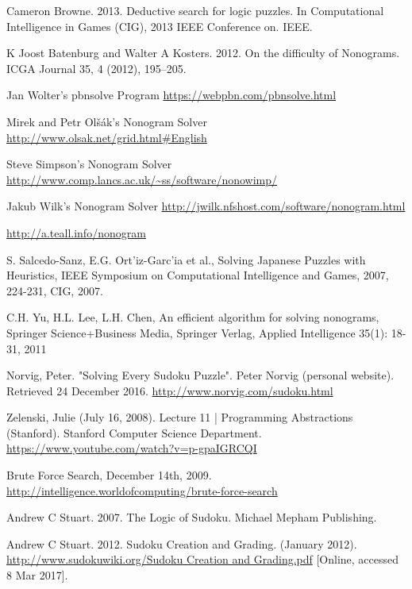 \documentclass{svproc}
\begin{document}
	\begin{thebibliography}{6}
		
		Cameron Browne. 2013. Deductive search for logic puzzles. In Computational
		Intelligence in Games (CIG), 2013 IEEE Conference on. IEEE.
		
		K Joost Batenburg and Walter A Kosters. 2012. On the difficulty of Nonograms.
		ICGA Journal 35, 4 (2012), 195–205.
		
		
		Jan Wolter's pbnsolve Program
		\url{https://webpbn.com/pbnsolve.html}
		
		Mirek and Petr Olšák's Nonogram Solver
		\url{http://www.olsak.net/grid.html#English}
		
		Steve Simpson's Nonogram Solver
		\url{http://www.comp.lancs.ac.uk/~ss/software/nonowimp/}
		
		Jakub Wilk's Nonogram Solver
		\url{http://jwilk.nfshost.com/software/nonogram.html}
		
		\url{http://a.teall.info/nonogram}
		
		S. Salcedo-Sanz, E.G. Ort’iz-Garc’ia et al., Solving Japanese Puzzles with
		Heuristics, IEEE Symposium on Computational Intelligence and Games,
		2007, 224-231, CIG, 2007.
		
		C.H. Yu, H.L. Lee, L.H. Chen, An efficient algorithm for solving nonograms, Springer Science+Business Media, Springer Verlag, Applied Intelligence 35(1): 18-31, 2011
		
		Norvig, Peter. "Solving Every Sudoku Puzzle". Peter Norvig (personal website). Retrieved 24 December 2016.
		\url{http://www.norvig.com/sudoku.html}
		
		Zelenski, Julie (July 16, 2008). Lecture 11 | Programming Abstractions (Stanford). Stanford Computer Science Department.
		\url{https://www.youtube.com/watch?v=p-gpaIGRCQI}
		
		 Brute Force Search, December 14th, 2009.
		\url{http://intelligence.worldofcomputing/brute-force-search}

		
		Andrew C Stuart. 2007. The Logic of Sudoku. Michael Mepham Publishing.
		
		Andrew C Stuart. 2012. Sudoku Creation and Grading. (January 2012). 
		\url{http://www.sudokuwiki.org/Sudoku Creation and Grading.pdf} 
		[Online, accessed 8 Mar 2017].
		

\end{thebibliography}
\end{document}
